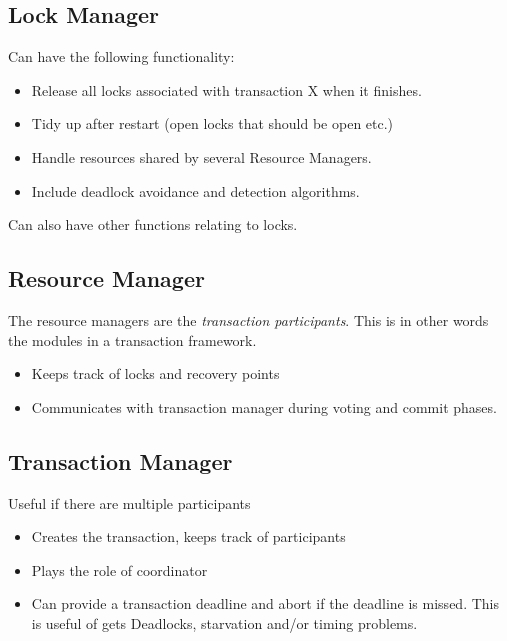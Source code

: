 \subsection{Lock Manager}
Can have the following functionality:
\begin{itemize}
\item Release all locks associated with transaction X when it finishes.
\item Tidy up after restart (open locks that should be open etc.)
\item Handle resources shared by several Resource Managers.
\item Include deadlock avoidance and detection algorithms.
\end{itemize}
Can also have other functions relating to locks.

\subsection{Resource Manager}
The resource managers are the \textit{transaction participants}. This is in other words the modules in a transaction framework.
\begin{itemize}
\item Keeps track of locks and recovery points
\item Communicates with transaction manager during voting and commit phases.
\end{itemize}

\subsection{Transaction Manager}
Useful if there are multiple participants
\begin{itemize}
\item Creates the transaction, keeps track of participants
\item Plays the role of coordinator
\item Can provide a transaction deadline and abort if the deadline is missed. This is useful of gets Deadlocks, starvation and/or timing problems.
\end{itemize}

